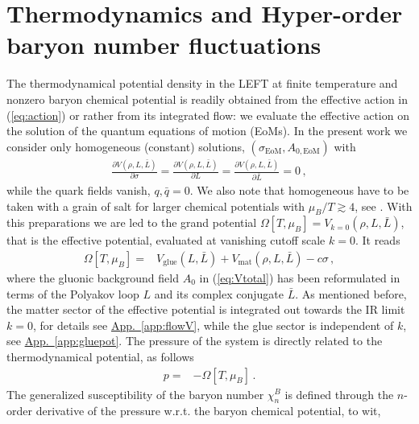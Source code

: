 \documentclass[%
reprint,
superscriptaddress,
showpacs,preprintnumbers,
amsmath,amssymb,
aps,
prd,
]{revtex4-1}
\def\eq#1{(\ref{#1})}
\begin{document}
	
	
	\section{Thermodynamics and Hyper-order baryon number fluctuations}
	\label{sec:hyper-fluc}
	
	
	The thermodynamical potential density in the LEFT at finite temperature and nonzero baryon chemical potential is readily obtained from the effective action in \eq{eq:action} or rather from its integrated flow: we evaluate the effective action on the solution of the quantum equations of motion (EoMs). In the present work we consider only homogeneous (constant) solutions,  $(\sigma_\textrm{EoM}, A_{0,\textrm{EoM}})$ with
	\begin{align}\label{eq:EoMs}
		\frac{\partial V(\rho, L,\bar L)}{\partial \sigma} =   \frac{\partial V(\rho, L,\bar L)}{\partial L} = \frac{\partial V(\rho, L,\bar L)}{\partial \bar L} =0\,, 
	\end{align}
	while the quark fields vanish, $q,\bar q=0$. We also note that homogeneous have to be taken with a grain of salt for larger chemical potentials with $\mu_B/T\gtrsim 4$, see \cite{Fu:2019hdw}. With this preparations we are led to the grand potential 
	$\Omega[T,\mu_B]= V_{k=0}(\rho, L,\bar L)$, that is the effective potential, evaluated at vanishing cutoff scale $k=0$. It reads   
	\begin{align}
		\Omega[T,\mu_B]=&V_{\mathrm{glue}}(L, \bar L)+V_{\mathrm{mat}}(\rho, L, \bar L)-c\sigma\,,\label{eq:Omega}
	\end{align}
	where the gluonic background field $A_0$ in \eq{eq:Vtotal} has been reformulated in terms of the Polyakov loop $L$ and its complex conjugate $\bar L$. As mentioned before, the matter sector of the effective potential is integrated out towards the IR limit $k=0$, for details see \hyperref[app:flowV]{App.~\ref{app:flowV}}, while the glue sector is independent of $k$, see \hyperref[app:gluepot]{App.~\ref{app:gluepot}}. The pressure of the system is directly related to the thermodynamical potential, as follows
	\begin{align}
		p=&-\Omega[T,\mu_B]\,.\label{eq:pres}
	\end{align}
	The generalized susceptibility of the baryon number $\chi^B_n$ is defined through the $n$-order derivative of the pressure w.r.t. the baryon chemical potential, to wit,
\end{document}
